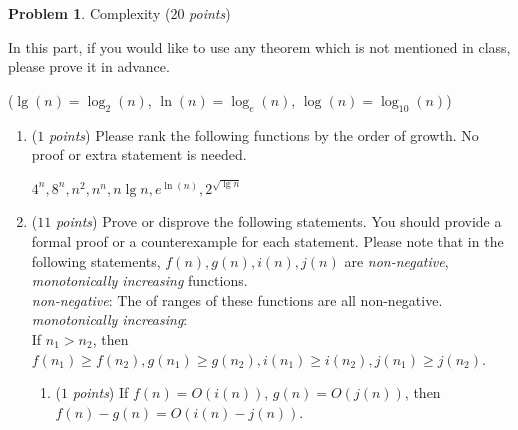 \documentclass[12pt,a4paper]{report}
\newcommand{\points}[1]{ ($#1$ \textit{points}) }
\theoremstyle{definition}
\newtheorem{problem}{\textbf{Problem}}
\newcommand\NoIndent[1]{
  \par\vbox{\parbox[t]{\linewidth}{#1}}
}
\newcommand{\solution}{\textbf{\NoIndent{Solution.}}}
\theoremstyle{definition}
\begin{document}
\newpage
\begin{problem}Complexity\points{20}

In this part, if you would like to use any theorem which is not mentioned in class, please prove it in advance.
\begin{center}
($\lg(n) = \log_2(n)$, $\ln(n) = \log_e(n)$, $\log(n) = \log_{10}(n)$)
\end{center}

\begin{enumerate}[label=\arabic*.]
\item \points{1}Please rank the following functions by the order of growth. No proof or extra statement is needed.
    \begin{center}$4^n, 8^n, n^2, n^n, n\lg n, e^{\ln(n)}, 2^{\sqrt{\lg n}}$\end{center}
\item \points{11}Prove or disprove the following statements. You should provide a formal proof or a counterexample for each statement. Please note that in the following statements, $f(n), g(n), i(n), j(n)$ are \textit{non-negative}, \textit{monotonically increasing} functions.\\
\textit{non-negative}: The of ranges of these functions are all non-negative.\\
\textit{monotonically increasing}:\\ If $n_1>n_2$, then $f(n_1)\geq f(n_2), g(n_1)\geq g(n_2), i(n_1)\geq i(n_2), j(n_1)\geq j(n_2)$.
    \begin{enumerate}[label=\alph*.]
    \item \points{1}If $f(n) = O(i(n))$, $g(n) = O(j(n))$, then $f(n) - g(n) = O(i(n) - j(n))$.\\


\end{enumerate}
\end{enumerate}
\end{problem}
\end{document}
